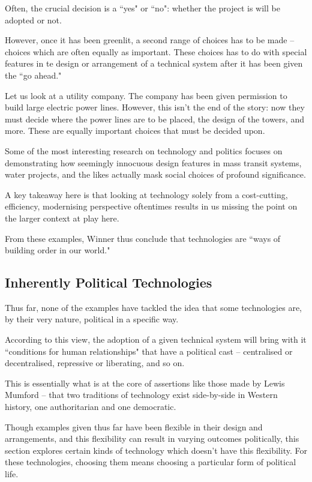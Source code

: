 \documentclass[openany]{book}
\begin{document}
Often, the crucial decision is a ``yes" or ``no": whether the project is will be adopted or not.

However, once it has been greenlit, a second range of choices has to be made -- choices which are often equally as important. These choices has to do with special features in te design or arrangement of a technical system after it has been given the ``go ahead."

\begin{example}
	Let us look at a utility company. The company has been given permission to build large electric power lines. However, this isn't the end of the story: now they must decide where the power lines are to be placed, the design of the towers, and more. These are equally important choices that must be decided upon.
\end{example}

Some of the most interesting research on technology and politics focuses on demonstrating how seemingly innocuous design features in mass transit systems, water projects, and the likes actually mask social choices of profound significance.

A key takeaway here is that looking at technology solely from a cost-cutting, efficiency, modernising perspective oftentimes results in us missing the point on the larger context at play here.

From these examples, Winner thus conclude that technologies are ``ways of building order in our world."

\subsection{Inherently Political Technologies}
Thus far, none of the examples have tackled the idea that some technologies are, by their very nature, political in a specific way.

According to this view, the adoption of a given technical system will bring with it ``conditions for human relationships" that have a political cast -- centralised or decentralised, repressive or liberating, and so on.

This is essentially what is at the core of assertions like those made by Lewis Mumford -- that two traditions of technology exist side-by-side in Western history, one authoritarian and one democratic.

Though examples given thus far have been flexible in their design and arrangements, and this flexibility can result in varying outcomes politically, this section explores certain kinds of technology which doesn't have this flexibility. For these technologies, choosing them means choosing a particular form of political life.
\end{document}
